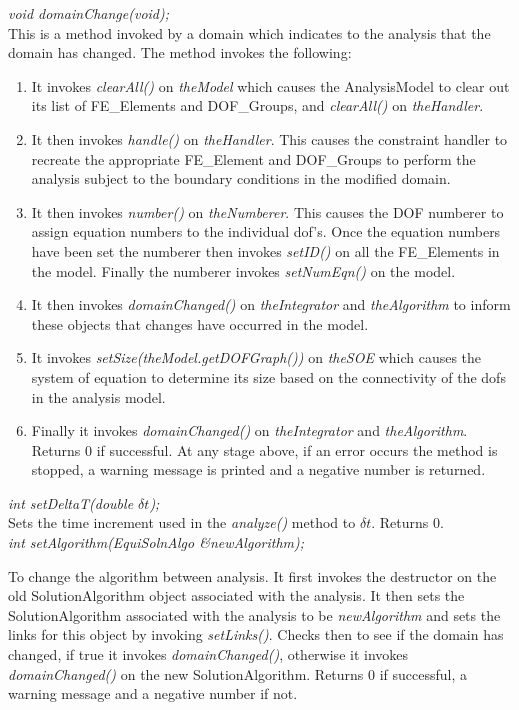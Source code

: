 {\em void domainChange(void);}\\
This is a method invoked by a domain which indicates to the analysis
that the domain has changed. The method invokes the following:
\begin{enumerate} 
\item It invokes {\em clearAll()} on {\em theModel} which causes the
AnalysisModel to clear out its list of FE\_Elements and DOF\_Groups,
and {\em clearAll()} on {\em theHandler}.
\item It then invokes {\em handle()} on {\em theHandler}. This causes
the constraint handler to recreate the appropriate FE\_Element and
DOF\_Groups to perform the analysis subject to the boundary conditions
in the modified domain.
\item It then invokes {\em number()} on {\em theNumberer}. This causes
the DOF numberer to assign equation numbers to the individual
dof's. Once the equation numbers have been set the numberer then
invokes {\em setID()} on all the FE\_Elements in the model. Finally
the numberer invokes {\em setNumEqn()} on the model.
\item It then invokes {\em domainChanged()} on {\em theIntegrator} and
{\em theAlgorithm} to inform these objects that changes have occurred
in the model.
\item It invokes {\em setSize(theModel.getDOFGraph())} on {\em
theSOE} which causes the system of equation to determine its size
based on the connectivity of the dofs in the analysis model. 
\item Finally it invokes {\em domainChanged()} on {\em theIntegrator} and 
{\em theAlgorithm}. 
Returns $0$ if successful. At any stage above, if an error occurs the
method is stopped, a warning message is printed and a negative number
is returned. \\ 
\end{enumerate}

{\em int setDeltaT(double $\delta t$);} \\
Sets the time increment used in the {\em analyze()} method to $\delta
t$. Returns $0$.\\

{\em int setAlgorithm(EquiSolnAlgo \&newAlgorithm);}

To change the algorithm between analysis. It first invokes the
destructor on the old SolutionAlgorithm object associated with the
analysis. It then sets the SolutionAlgorithm 
associated with the analysis to be {\em newAlgorithm} and sets the
links for this object by invoking {\em setLinks()}. Checks then to
see if the domain has changed, if true it invokes {\em
domainChanged()}, otherwise it invokes {\em domainChanged()} on the
new SolutionAlgorithm. Returns $0$ if successful, a warning message
and a negative number if not.\\

